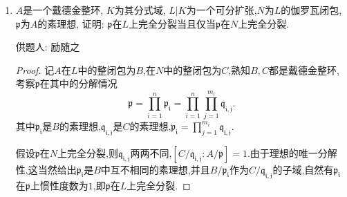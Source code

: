 \documentclass[lang=cn,12pt,a4paper]{elegantpaper.cls}
\begin{document}
\begin{enumerate}
\begin{proof}
\begin{remark}
此题背景是$\rm{Ricci}$流理论中的$\rm{Isenberg}$-$\rm{Jackson}$定理, 其具体研究了在对称性充分好的$\mathbb{S}^3$上, 给定初始度量后相应$\rm{Ricci}$流的解的性态. 为此, 视$\mathbb{S}^3=SU(2)$为李群并考虑其李代数生成元
\[x_1=\begin{pmatrix}
 i & 0\\
 0 & -i\\
\end{pmatrix},x_2=\begin{pmatrix}
0 & 1\\
-1 & 0\\
\end{pmatrix},x_3=\begin{pmatrix}
0 &i\\
i & 0\\
\end{pmatrix}.
\]
之后取$\{x_1,x_2,x_3\}$的对偶左不变$1$-形式$\{\sigma^1,\sigma^2,\sigma^3\}$. 则$\mathbb{S}^3$上的度量可以表示为
\[g=A\sigma^1\otimes \sigma^1+B\sigma^2\otimes \sigma^2+C\sigma^3\otimes \sigma^3.\]
将其代入$\rm{Ricci}$流方程$\frac{\partial g(t)}{\partial t}=-2\rm{Ric}(g(t))$中就可计算得到题目中的方程.

在该题目结论的基础上, 还可进一步得到
\[\lim_{t\rightarrow T^-}\frac{A(t)}{4(T-t)}=\lim_{t\rightarrow T^-}\frac{B(t)}{4(T-t)}=\lim_{t\rightarrow T^-}\frac{C(t)}{4(T-t)}=1.\]
这表明度量$\frac{1}{4(T-t)}g(t)$在$t\rightarrow T^-$时收敛于$\mathbb{S}^3$上标准度量, 这就是$\rm{Ricci}$流研究中常用的爆破技巧.
\end{remark}

\end{proof}
	
	
		\item $A$是一个戴德金整环, $K$为其分式域, $L|K$为一个可分扩张,$N$为$L$的伽罗瓦闭包, $\mathfrak{p}$为$A$的素理想, 证明: $\mathfrak{p}$在$L$上完全分裂当且仅当$\mathfrak{p}$在$N$上完全分裂.
	\begin{flushright}
		\kaishu
		供题人: 励随之
	\end{flushright}
	\begin{proof}
		记$A$在$L$中的整闭包为$B$,在$N$中的整闭包为$C$,熟知$B,C$都是戴德金整环,考察$\mathfrak{p}$在其中的分解情况
		\[\mathfrak{p}=\prod_{i=1}^n \mathfrak{p_i}=\prod_{i=1}^n \prod_{j=1}^{m_i} \mathfrak{q_{i,j}}.\]
		其中$\mathfrak{p_i}$是$B$的素理想,$\mathfrak{q_{i,j}}$是$C$的素理想,$\mathfrak{p_i}=\prod_{j=1}^{m_i} \mathfrak{q_{i,j}}$.
		
		假设$\mathfrak{p}$在$N$上完全分裂,则$\mathfrak{q_{i,j}}$两两不同,$[C/\mathfrak{q_{i,j}}:A/\mathfrak{p}]=1$.由于理想的唯一分解性,这当然给出$\mathfrak{p_i}$是$B$中互不相同的素理想,并且$B/\mathfrak{p_i}$作为$C/\mathfrak{q_{i,j}}$的子域,自然有$\mathfrak{p_i}$在$\mathfrak{p}$上惯性度数为$1$,即$\mathfrak{p}$在$L$上完全分裂.
		

\end{proof}
\end{enumerate}
\end{document}
